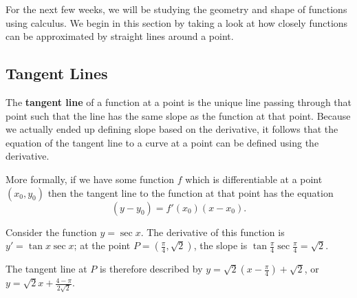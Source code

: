 


For the next few weeks, we will be studying the geometry and shape of functions using calculus. We begin in
this section by taking a look at how closely functions can be approximated by straight lines around a point.

\subsection*{Tangent Lines}
The \textbf{tangent line} of a function at a point is the unique line passing through that point such that the
line has the same slope as the function at that point. Because we actually ended up defining slope based
on the derivative, it follows that the equation of the tangent line to a curve at a point can be defined
using the derivative.

More formally, if we have some function $ f $ which is differentiable at a point $ (x_0, y_0) $ then the
tangent line to the function at that point has the equation
\begin{displaymath}
  (y - y_0) = f'(x_0) (x - x_0).
\end{displaymath}

\begin{ex}
  Consider the function $ y = \sec x $. The derivative of this function is $ y' = \tan x \sec x $;
  at the point $ P = \left( \frac{\pi}{4}, \sqrt{2} \right) $, the slope is $ \tan \frac{\pi}{4} \sec \frac{\pi}{4} = \sqrt{2} $.

  The tangent line at $ P $ is therefore described by $ y = \sqrt{2}(x - \frac{\pi}{4}) + \sqrt{2} $, or
  $ y = \sqrt{2}x + \frac{4 - \pi}{2\sqrt{2}} $.

  \begin{center}
  \end{center}
\end{ex}

